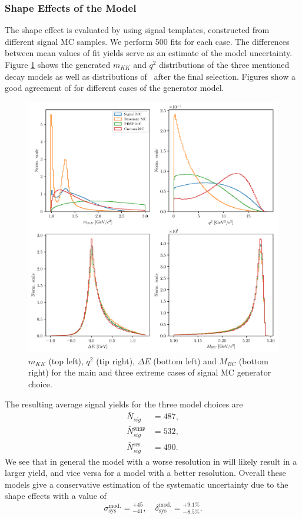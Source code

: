 \subsubsection{Shape Effects of the Model}
The shape effect is evaluated by using signal templates, constructed from different signal MC samples. We perform 500 fits for each case. The differences between mean values of fit yields serve as an estimate of the model uncertainty. Figure \ref{fig:model_cases} shows the generated $m_{KK}$ and $q^2$ distributions of the three mentioned decay models as well as distributions of \vars~after the final selection. Figures show a good agreement of \vars for different cases of the generator model.
\begin{figure}[H]
	\centering
	\captionsetup{width=0.8\linewidth}
	\includegraphics[width=\linewidth]{fig/model_cases}
	\caption{$m_{KK}$ (top left), $q^2$ (tip right), $\Delta E$ (bottom left) and $M_{BC}$ (bottom right) for the main and three extreme cases of signal MC generator choice.}
	\label{fig:model_cases}
\end{figure}
The resulting average signal yields for the three model choices are
\begin{align}
\bar N {}_{sig} &= 487, \\
\bar N {}_{sig}^{\mathtt{PHSP}} &= 532, \\
\bar N {}_{sig}^{\mathrm{res.}} &= 490.
\end{align}
We see that in general the model with a worse resolution in \vars will likely result in a larger yield, and vice versa for a model with a better resolution. Overall these models give a conservative estimation of the systematic uncertainty due to the shape effects with a value of 
\begin{equation}
\sigma_{\mathrm{sys}}^{\mathrm{mod.}} = {}^{+45}_{-41},\quad \delta_{\mathrm{sys}}^{\mathrm{mod.}} = {}^{+9.1\%}_{-8.5\%}.
\end{equation}

